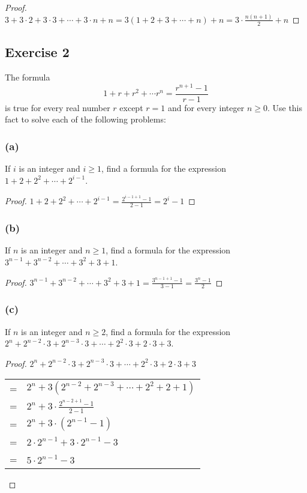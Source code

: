 \documentclass[14pt]{extarticle}
\newcommand{\dps}{\displaystyle}
\begin{document}
    \begin{proof}
        \(3 + 3 \cdot 2 + 3 \cdot 3 + \cdots + 3 \cdot n + n = 3(1 + 2 + 3 + \cdots + n) + n = 3 \cdot \frac{n(n+1)}{2} + n\)
    \end{proof}

    \subsection{Exercise 2}
    The formula
    \[
        1 + r + r^2 + \cdots r^n = \frac{r^{n+1} - 1}{r-1}
    \]
    is true for every real number $r$ except \(r = 1\) and for every integer \(n \geq 0\).
    Use this fact to solve each of the following problems:

    \subsubsection{(a)}
    If $i$ is an integer and \(i \geq 1\), find a formula for
    the expression \(1 + 2 + 2^2 + \cdots + 2^{i-1}\).

    \begin{proof}
        \(\dps 1 + 2 + 2^2 + \cdots + 2^{i-1} = \frac{2^{i-1+1} - 1}{2-1} = 2^i - 1\)
    \end{proof}

    \subsubsection{(b)}
    If $n$ is an integer and \(n \geq 1\), find a formula for
    the expression \(3^{n-1} + 3^{n-2} + \cdots + 3^2 + 3 + 1\).

    \begin{proof}
        \(\dps 3^{n-1} + 3^{n-2} + \cdots + 3^2 + 3 + 1 = \frac{3^{n-1+1} - 1}{3-1} = \frac{3^n - 1}{2}\)
    \end{proof}

    \subsubsection{(c)}
    If $n$ is an integer and \(n \geq 2\), find a formula for
    the expression
    \(2^n + 2^{n-2} \cdot 3 + 2^{n-3} \cdot 3 + \cdots + 2^2 \cdot 3 + 2 \cdot 3 + 3\).

    \begin{proof}
        \(2^n + 2^{n-2} \cdot 3 + 2^{n-3} \cdot 3 + \cdots + 2^2 \cdot 3 + 2 \cdot 3 + 3\)
        \begin{center}
            \begin{tabular}{cl}
                = & \(2^n + 3(2^{n-2} + 2^{n-3} + \cdots + 2^2 + 2 + 1)\) \\
                = & \(\dps 2^n + 3 \cdot \frac{2^{n-2+1} - 1}{2 - 1}\)    \\
                = & \(2^n + 3 \cdot (2^{n-1} - 1)\)                       \\
                = & \(2 \cdot 2^{n-1} + 3 \cdot 2^{n-1} - 3\)             \\
                = & \(5 \cdot 2^{n-1} - 3\)
            \end{tabular}
        \end{center}
    \end{proof}
\end{document}

